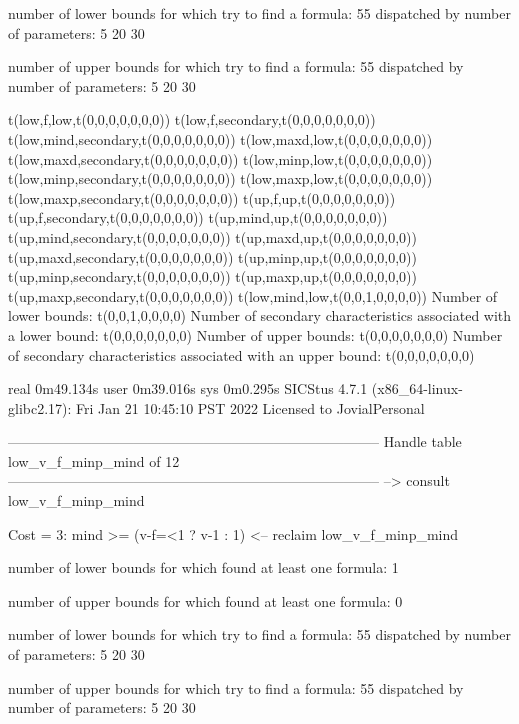 number of lower bounds for which try to find a formula: 55
dispatched by number of parameters: 5  20  30

number of upper bounds for which try to find a formula: 55
dispatched by number of parameters: 5  20  30

t(low,f,low,t(0,0,0,0,0,0,0))
t(low,f,secondary,t(0,0,0,0,0,0,0))
t(low,mind,secondary,t(0,0,0,0,0,0,0))
t(low,maxd,low,t(0,0,0,0,0,0,0))
t(low,maxd,secondary,t(0,0,0,0,0,0,0))
t(low,minp,low,t(0,0,0,0,0,0,0))
t(low,minp,secondary,t(0,0,0,0,0,0,0))
t(low,maxp,low,t(0,0,0,0,0,0,0))
t(low,maxp,secondary,t(0,0,0,0,0,0,0))
t(up,f,up,t(0,0,0,0,0,0,0))
t(up,f,secondary,t(0,0,0,0,0,0,0))
t(up,mind,up,t(0,0,0,0,0,0,0))
t(up,mind,secondary,t(0,0,0,0,0,0,0))
t(up,maxd,up,t(0,0,0,0,0,0,0))
t(up,maxd,secondary,t(0,0,0,0,0,0,0))
t(up,minp,up,t(0,0,0,0,0,0,0))
t(up,minp,secondary,t(0,0,0,0,0,0,0))
t(up,maxp,up,t(0,0,0,0,0,0,0))
t(up,maxp,secondary,t(0,0,0,0,0,0,0))
t(low,mind,low,t(0,0,1,0,0,0,0))
Number of lower bounds:                                             t(0,0,1,0,0,0,0)
Number of secondary characteristics associated with a lower bound:  t(0,0,0,0,0,0,0)
Number of upper bounds:                                             t(0,0,0,0,0,0,0)
Number of secondary characteristics associated with an upper bound: t(0,0,0,0,0,0,0)

real	0m49.134s
user	0m39.016s
sys	0m0.295s
SICStus 4.7.1 (x86_64-linux-glibc2.17): Fri Jan 21 10:45:10 PST 2022
Licensed to JovialPersonal


--------------------------------------------------------------------------------
Handle table low_v_f_minp_mind of 12
--------------------------------------------------------------------------------
--> consult low_v_f_minp_mind

Cost =  3:  mind >= (v-f=<1 ? v-1 : 1)
<-- reclaim low_v_f_minp_mind

number of lower bounds for which found at least one formula: 1

number of upper bounds for which found at least one formula: 0

number of lower bounds for which try to find a formula: 55
dispatched by number of parameters: 5  20  30

number of upper bounds for which try to find a formula: 55
dispatched by number of parameters: 5  20  30


